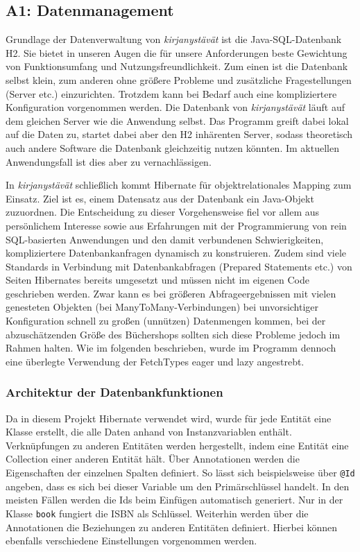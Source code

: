	
	\subsection{A1: Datenmanagement}\label{sec:umsetzung:DB:DM}
	Grundlage der Datenverwaltung von \textit{kirjanystävät} ist die Java-SQL-Datenbank H2. Sie bietet in unseren Augen die für unsere Anforderungen beste Gewichtung von Funktionsumfang und Nutzungsfreundlichkeit. Zum einen ist die Datenbank selbst klein, zum anderen ohne größere Probleme und zusätzliche Fragestellungen (Server etc.) einzurichten. Trotzdem kann bei Bedarf auch eine kompliziertere Konfiguration vorgenommen werden. Die Datenbank von \textit{kirjanystävät} läuft auf dem gleichen Server wie die Anwendung selbst. Das Programm greift dabei lokal auf die Daten zu, startet dabei aber den H2 inhärenten Server, sodass theoretisch auch andere Software die Datenbank gleichzeitig nutzen könnten. Im aktuellen Anwendungsfall ist dies aber zu vernachlässigen.
	
	In \textit{kirjanystävät} schließlich kommt Hibernate für objektrelationales Mapping zum Einsatz. Ziel ist es, einem Datensatz aus der Datenbank ein Java-Objekt zuzuordnen. Die Entscheidung zu dieser Vorgehensweise fiel vor allem aus persönlichem Interesse sowie aus Erfahrungen mit der Programmierung von rein SQL-basierten Anwendungen und den damit verbundenen Schwierigkeiten, kompliziertere Datenbankanfragen dynamisch zu konstruieren. Zudem sind viele Standards in Verbindung mit Datenbankabfragen (Prepared Statements etc.) von Seiten Hibernates bereits umgesetzt und müssen nicht im eigenen Code geschrieben werden. Zwar kann es bei größeren Abfrageergebnissen mit vielen genesteten Objekten (bei ManyToMany-Verbindungen) bei unvorsichtiger Konfiguration schnell zu großen (unnützen) Datenmengen kommen, bei der abzuschätzenden Größe des Büchershops sollten sich diese Probleme jedoch im Rahmen halten. Wie im folgenden beschrieben, wurde im Programm dennoch eine überlegte Verwendung der FetchTypes eager und lazy angestrebt.
		
		\subsubsection{Architektur der Datenbankfunktionen}\label{sec:umsetzung:DB:Funktionen}
		Da in diesem Projekt Hibernate verwendet wird, wurde für jede Entität eine Klasse erstellt, die alle Daten anhand von Instanzvariablen enthält. Verknüpfungen zu anderen Entitäten werden hergestellt, indem eine Entität eine Collection einer anderen Entität hält. Über Annotationen werden die Eigenschaften der einzelnen Spalten definiert. So lässt sich beispielsweise über \texttt{@Id} angeben, dass es sich bei dieser Variable um den Primärschlüssel handelt. In den meisten Fällen werden die Ids beim Einfügen automatisch generiert. Nur in der Klasse \texttt{book} fungiert die ISBN als Schlüssel. Weiterhin werden über die Annotationen die Beziehungen zu anderen Entitäten definiert. Hierbei können ebenfalls verschiedene Einstellungen vorgenommen werden.
		
